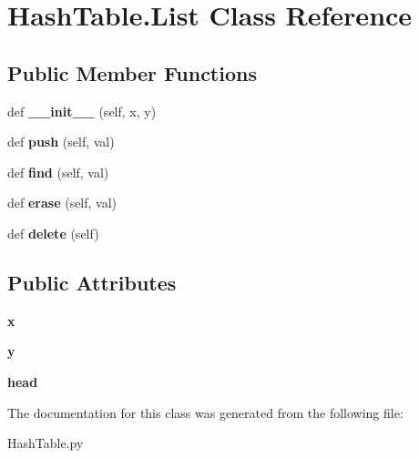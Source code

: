 \hypertarget{class_hash_table_1_1_list}{}\section{Hash\+Table.\+List Class Reference}
\label{class_hash_table_1_1_list}
\subsection*{Public Member Functions}
\begin{DoxyCompactItemize}
\item 
\mbox{\label{class_hash_table_1_1_list_af469890a87f472122f5effd5438f04c7}} 
def {\bfseries \+\_\+\+\_\+init\+\_\+\+\_\+} (self, x, y)
\item 
\mbox{\label{class_hash_table_1_1_list_ada3db777d3659dfeff1bdeb93c75f898}} 
def {\bfseries push} (self, val)
\item 
\mbox{\label{class_hash_table_1_1_list_a274cd4a837d3859cb8d20553a928fd1b}} 
def {\bfseries find} (self, val)
\item 
\mbox{\label{class_hash_table_1_1_list_a173b36dbf5dab4c2c96290cec62e0d81}} 
def {\bfseries erase} (self, val)
\item 
\mbox{\label{class_hash_table_1_1_list_a8e2a73bfa4ab6bb87136f1f9374333b4}} 
def {\bfseries delete} (self)
\end{DoxyCompactItemize}
\subsection*{Public Attributes}
\begin{DoxyCompactItemize}
\item 
\mbox{\label{class_hash_table_1_1_list_a22bd9f7848a534b560af82fafd45a40a}} 
{\bfseries x}
\item 
\mbox{\label{class_hash_table_1_1_list_aa1631c49226f763fbfca02adeaf35604}} 
{\bfseries y}
\item 
\mbox{\label{class_hash_table_1_1_list_a1a51fff99f28e2a98c03725e6aea66e0}} 
{\bfseries head}
\end{DoxyCompactItemize}


The documentation for this class was generated from the following file\+:\begin{DoxyCompactItemize}
\item 
Hash\+Table.\+py\end{DoxyCompactItemize}
